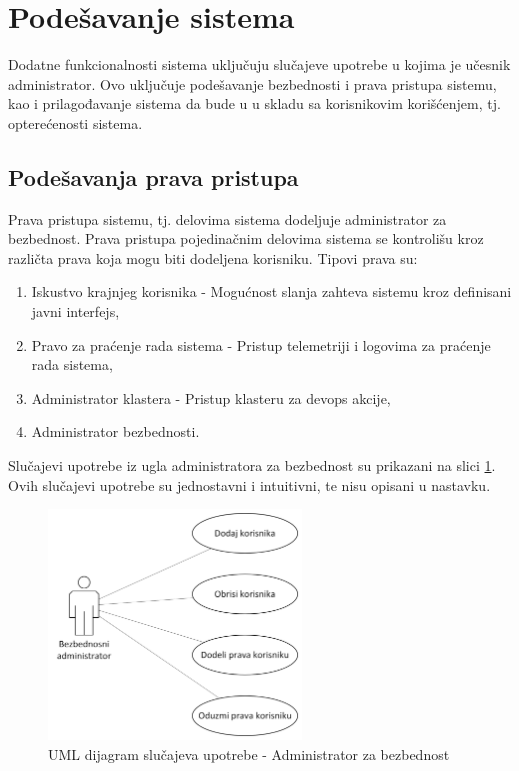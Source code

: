 \documentclass[12pt,oneside]{memoir}
\begin{document}
\section{Podešavanje sistema}
Dodatne funkcionalnosti sistema uključuju slučajeve upotrebe u kojima je učesnik administrator. Ovo uključuje podešavanje bezbednosti i prava pristupa sistemu, kao i prilagođavanje sistema da bude u u skladu sa korisnikovim korišćenjem, tj. opterećenosti sistema.


\subsection{Podešavanja prava pristupa}
Prava pristupa sistemu, tj. delovima sistema dodeljuje administrator za bezbednost. Prava pristupa pojedinačnim delovima sistema se kontrolišu kroz različta prava koja mogu biti dodeljena korisniku. Tipovi prava su:
	\begin{enumerate}
	\item Iskustvo krajnjeg korisnika - Mogućnost slanja zahteva sistemu kroz definisani javni interfejs,
	\item Pravo za praćenje rada sistema - Pristup telemetriji i logovima za praćenje rada sistema,
	\item Administrator klastera - Pristup klasteru za devops akcije,
	\item Administrator bezbednosti.
	\end{enumerate}
Slučajevi upotrebe iz ugla administratora za bezbednost su prikazani na slici \ref{fig:slucajupotrebe_aadadmin}. Ovih slučajevi upotrebe su jednostavni i intuitivni, te nisu opisani u nastavku.

\begin{figure}[!ht]
  \centering
  \label{fig:slucajupotrebe_aadadmin}
  \includegraphics[width=0.6\textwidth]{./images/dijagram_slucajeva_upotrebe_administrator_sistema_aadadmin.png}
  \caption{UML dijagram slučajeva upotrebe - Administrator za bezbednost}
\end{figure}
\end{document}
